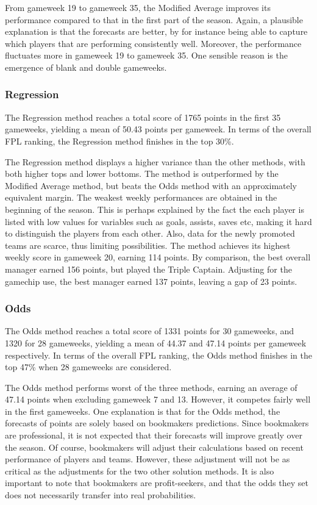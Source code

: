 \newpar

From gameweek 19 to gameweek 35, the Modified Average improves its performance compared to that in the first part of the season. Again, a plausible explanation is that the forecasts are better, by for instance being able to capture which players that are performing consistently well. Moreover, the performance fluctuates more in gameweek 19 to gameweek 35. One sensible reason is the emergence of blank and double gameweeks. 


\subsubsection{Regression}

The Regression method reaches a total score of 1765 points in the first 35 gameweeks, yielding a mean of 50.43 points per gameweek. In terms of the overall FPL ranking, the Regression method finishes in the top 30\%.

\newpar

The Regression method displays a higher variance than the other methods, with both higher tops and lower bottoms. The method is outperformed by the Modified Average method, but beats the Odds method with an approximately equivalent margin. The weakest weekly performances are obtained in the beginning of the season. This is perhaps explained by the fact the each player is listed with low values for variables such as goals, assists,  saves etc, making it hard to distinguish the players from each other. Also, data for the newly promoted teams are scarce, thus limiting possibilities. The method achieves its highest weekly score in gameweek 20, earning 114 points. By comparison, the best overall manager earned 156 points, but played the Triple Captain. Adjusting for the gamechip use, the best manager earned 137 points, leaving a gap of 23 points.

\subsubsection{Odds}
The Odds method reaches a total score of 1331 points for 30 gameweeks, and 1320 for 28 gameweeks, yielding a mean of 44.37 and 47.14 points per gameweek respectively. In terms of the overall FPL ranking, the Odds method finishes in the top 47\% when 28 gameweeks are considered.

\newpar

The Odds method performs worst of the three methods, earning an average of 47.14 points when excluding gameweek 7 and 13. However, it competes fairly well in the first gameweeks. One explanation is that for the Odds method, the forecasts of points are solely based on bookmakers predictions. Since bookmakers are professional, it is not expected that their forecasts will improve greatly over the season. Of course, bookmakers will adjust their calculations based on recent performance of players and teams. However, these adjustment will not be as critical as the adjustments for the two other solution methods. It is also important to note that bookmakers are profit-seekers, and that the odds they set does not necessarily transfer into real probabilities.

